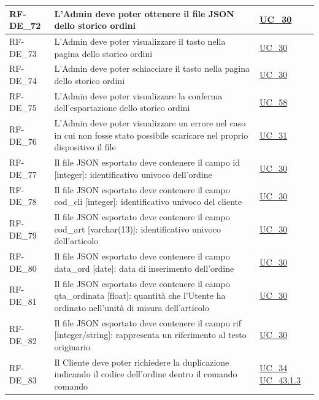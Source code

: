 \begin{longtable}{|>{\raggedright}p{}|>{\raggedright\arraybackslash}p{}|>{\raggedright\arraybackslash}p{}|}
	\hline
	RF-DE\_72 \hypertarget{rf-de_72} & L'Admin deve poter ottenere il file JSON dello storico ordini & \hyperref[uc_30]{UC\_30} \\
	\hline
	RF-DE\_73 \hypertarget{rf-de_73} & L'Admin deve poter visualizzare il tasto \vr{Esporta} nella pagina dello storico ordini & \hyperref[uc_30]{UC\_30} \\
	\hline
	RF-DE\_74 \hypertarget{rf-de_74} & L'Admin deve poter schiacciare il tasto \vr{Esporta} nella pagina dello storico ordini & \hyperref[uc_30]{UC\_30} \\
	\hline
	RF-DE\_75 \hypertarget{rf-de_75} & L'Admin deve poter visualizzare la conferma dell'esportazione dello storico ordini & \hyperref[uc_58]{UC\_58} \\
	\hline
	RF-DE\_76 \hypertarget{rf-de_76} & L'Admin deve poter visualizzare un errore nel caso in cui non fosse stato possibile scaricare nel proprio dispositivo il file & \hyperref[uc_31]{UC\_31} \\
	\hline
	RF-DE\_77 \hypertarget{rf-de_77} & Il file JSON esportato deve contenere il campo id [integer]: identificativo univoco dell'ordine & \hyperref[uc_30]{UC\_30} \\
	\hline
	RF-DE\_78 \hypertarget{rf-de_78} & Il file JSON esportato deve contenere il campo cod\_cli [integer]: identificativo univoco del cliente & \hyperref[uc_30]{UC\_30} \\
	\hline
	RF-DE\_79 \hypertarget{rf-de_79} & Il file JSON esportato deve contenere il campo cod\_art [varchar(13)]: identificativo univoco dell'articolo & \hyperref[uc_30]{UC\_30} \\
	\hline
	RF-DE\_80 \hypertarget{rf-de_80} & Il file JSON esportato deve contenere il campo data\_ord [date]: data di inserimento dell'ordine & \hyperref[uc_30]{UC\_30} \\
	\hline
	RF-DE\_81 \hypertarget{rf-de_81} & Il file JSON esportato deve contenere il campo qta\_ordinata [float]: quantità che l'Utente ha ordinato nell'unità di misura dell'articolo & \hyperref[uc_30]{UC\_30} \\
	\hline
	RF-DE\_82 \hypertarget{rf-de_82} & Il file JSON esportato deve contenere il campo rif [integer/string]: rappresenta un riferimento al testo originario & \hyperref[uc_30]{UC\_30} \\
	\hline
	RF-DE\_83 \hypertarget{rf-de_83} & Il Cliente deve poter richiedere la duplicazione indicando il codice dell'ordine dentro il comando comando \vr{/duplica\{xx\}} & \hyperref[uc_34]{UC\_34} \newline \hyperref[uc_43.1.3]{UC\_43.1.3} \\

\end{longtable}
